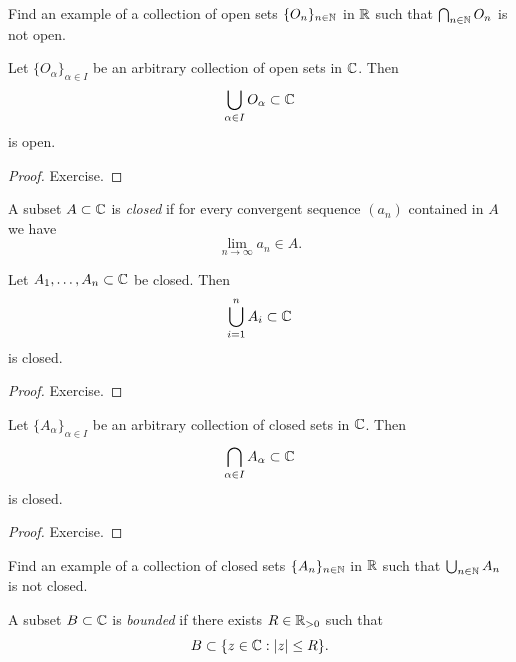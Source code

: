 \documentclass[../analysis1.tex]{subfiles}
\begin{document}
\begin{exercise*}
    Find an example of a collection of open sets $\{O_n\}_{n\in\mathbb{N}}$ in $\mathbb{R}$ such that $\bigcap_{n\in\mathbb{N}}O_n$ is not open.
\end{exercise*}

\begin{lemma}
    \begin{shaded*}
        Let $\{O_\alpha\}_{\alpha\in I}$ be an arbitrary collection of open sets in $\mathbb{C}$. Then
        \[\bigcup_{\alpha\in I}O_\alpha \subset \mathbb{C}\]
        is open.
    \end{shaded*}
\end{lemma}
\begin{proof}
    Exercise.
\end{proof}

\begin{definition}
    \begin{shaded*}
        A subset $A\subset\mathbb{C}$ is \textit{closed} if for every convergent sequence $(a_n)$ contained in $A$ we have
        \[\lim_{n\to\infty}a_n\in A.\]
    \end{shaded*}
\end{definition}


\begin{lemma}
    \begin{shaded*}
        Let $A_1,\dots,A_n\subset\mathbb{C}$ be closed. Then
        \[\bigcup_{i=1}^n A_i\subset\mathbb{C}\]
        is closed.
    \end{shaded*}
\end{lemma}
\begin{proof}
    Exercise.\qedhere
\end{proof}

\begin{lemma}
    \begin{shaded*}
        Let $\{A_\alpha\}_{\alpha\in I}$ be an arbitrary collection of closed sets in $\mathbb{C}$. Then
        \[\bigcap_{\alpha\in I}A_\alpha\subset\mathbb{C}\]
        is closed.
    \end{shaded*}
\end{lemma}
\begin{proof}
    Exercise.
\end{proof}
\begin{exercise*}
    Find an example of a collection of closed sets $\{A_n\}_{n\in\mathbb{N}}$ in $\mathbb{R}$ such that $\bigcup _{n\in\mathbb{N}}A_n$ is not closed.
\end{exercise*}

\begin{definition}
    \begin{shaded*}
        A subset $B\subset\mathbb{C}$ is \textit{bounded} if there exists $R\in\mathbb{R}_{>0}$ such that
        \[B\subset \{z\in\mathbb{C}:|z|\le R\}.\]
    \end{shaded*}
\end{definition}
\end{document}
